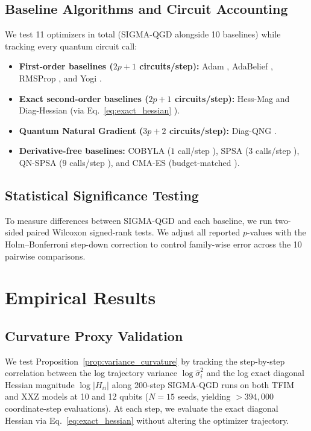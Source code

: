 \documentclass[11pt,a4paper]{article}
\begin{document}
\subsection{Baseline Algorithms and Circuit Accounting}
We test 11 optimizers in total (SIGMA-QGD alongside 10 baselines) while tracking every quantum circuit call:
\begin{itemize}
    \item \textbf{First-order baselines ($2p+1$ circuits/step):} Adam \cite{kingma2014adam}, AdaBelief \cite{zhuang2020adabelief}, RMSProp \cite{tieleman2012lecture}, and Yogi \cite{zaheer2018adaptive}.
    \item \textbf{Exact second-order baselines ($2p+1$ circuits/step):} Hess-Mag and Diag-Hessian (via Eq.~\eqref{eq:exact_hessian} \cite{wierichs2022general}).
    \item \textbf{Quantum Natural Gradient ($3p+2$ circuits/step):} Diag-QNG \cite{stokes2020quantum,wierichs2020avoiding}.
    \item \textbf{Derivative-free baselines:} COBYLA ($1$ call/step \cite{powell1994direct}), SPSA ($3$ calls/step \cite{spall1992multivariate,spall1997accelerated,spall1998implementation,spall2000adaptive}), QN-SPSA ($9$ calls/step \cite{gacon2021simultaneous}), and CMA-ES (budget-matched \cite{novak2025benchmarking}).
\end{itemize}

\subsection{Statistical Significance Testing}
To measure differences between SIGMA-QGD and each baseline, we run two-sided paired Wilcoxon signed-rank tests. We adjust all reported $p$-values with the Holm--Bonferroni step-down correction to control family-wise error across the 10 pairwise comparisons.

\section{Empirical Results}
\label{sec:results}

\subsection{Curvature Proxy Validation}
\label{sec:exp_proxy}
We test Proposition~\ref{prop:variance_curvature} by tracking the step-by-step correlation between the log trajectory variance $\log \hat{\sigma}_i^2$ and the log exact diagonal Hessian magnitude $\log |H_{ii}|$ along 200-step SIGMA-QGD runs on both TFIM and XXZ models at 10 and 12 qubits ($N=15$ seeds, yielding $>394{,}000$ coordinate-step evaluations). At each step, we evaluate the exact diagonal Hessian via Eq.~\eqref{eq:exact_hessian} without altering the optimizer trajectory.
\end{document}
